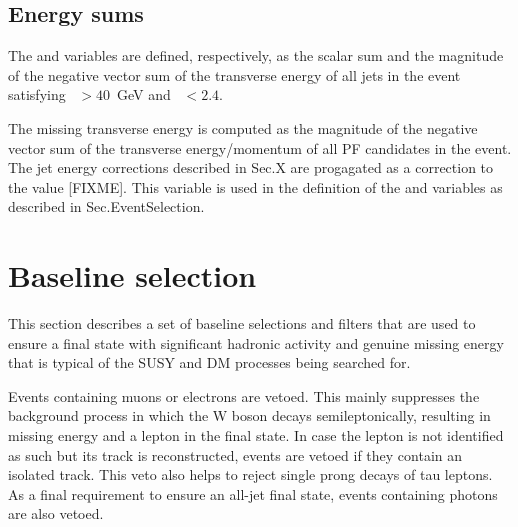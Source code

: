\subsection*{Energy sums}

The \scalht and \MHT variables are defined, respectively, as the scalar sum and 
the magnitude of the negative vector sum of the transverse energy of all jets 
in the event satisfying \pt~$>40$~GeV and \etaabs~$<2.4$.

The missing transverse energy \met is computed as the magnitude of the negative 
vector sum of the transverse energy/momentum of all PF candidates in the event. 
The jet energy corrections described in Sec.X are progagated as a correction to 
the \met value [FIXME]. This variable is used in the definition of the \mt and 
\mhtmet variables as described in Sec.EventSelection.



\section{Baseline selection}
\label{analysis-baselineselections}

This section describes a set of baseline selections and filters that are used 
to ensure a final state with significant hadronic activity and genuine missing 
energy that is typical of the SUSY and DM processes being searched for.

Events containing muons or electrons are vetoed. This mainly suppresses the 
\wj background process in which the W boson decays semileptonically, 
resulting in missing energy and a lepton in the final state. In case the lepton 
is not identified as such but its track is reconstructed, events are vetoed if 
they contain an isolated track. This veto also helps to reject single prong 
decays of tau leptons. %
As a final requirement to ensure an all-jet final state, events containing 
photons are also vetoed.

